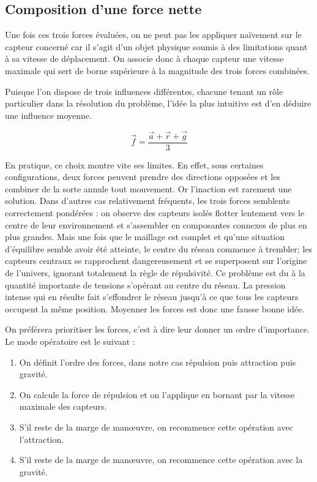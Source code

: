 \documentclass[10pt]{article}
\begin{document}
\begin{multicols}{2}
\subsection*{Composition d'une force nette}

Une fois ces trois forces évaluées, on ne peut pas les appliquer
naïvement sur le capteur concerné car il s'agit d'un objet physique
soumis à des limitations quant à sa vitesse de déplacement. On associe
donc à chaque capteur une vitesse maximale qui sert de borne
supérieure à la magnitude des trois forces combinées.

Puisque l'on dispose de trois influences différentes, chacune tenant
un rôle particulier dans la résolution du problème, l'idée la plus
intuitive est d'en déduire une influence moyenne.

$$
\vec{f} = \frac{\vec{a} + \vec{r} + \vec{g}}{3}
$$

En pratique, ce choix montre vite ses limites. En effet, sous
certaines configurations, deux forces peuvent prendre des directions
opposées et les combiner de la sorte annule tout mouvement. Or
l'inaction est rarement une solution. Dans d'autres cas relativement
fréquents, les trois forces semblents correctement pondérées : on
observe des capteurs isolés flotter lentement vers le centre de leur
environnement et s'assembler en composantes connexes de plus en plus
grandes. Mais une fois que le maillage est complet et qu'une situation
d'équilibre semble avoir été atteinte, le centre du réseau commence à
trembler; les capteurs centraux se rapprochent dangereusement et se
superposent sur l'origine de l'univers, ignorant totalement la règle
de répulsivité. Ce problème est du à la quantité importante de
tensions s'opérant au centre du réseau. La pression intense qui en
résulte fait s'effondrer le réseau jusqu'à ce que tous les capteurs
occupent la même position. Moyenner les forces est donc une fausse
bonne idée.

On préférera prioritiser les forces, c'est à dire leur donner un ordre
d'importance. Le mode opératoire est le suivant :

\begin{enumerate}
\item{On définit l'ordre des forces, dans notre cas répulsion puis
  attraction puis gravité.}
\item{On calcule la force de répulsion et on l'applique en bornant par
  la vitesse maximale des capteurs.}
\item{S'il reste de la marge de man\oe uvre, on recommence cette
  opération avec l'attraction.}
\item{S'il reste de la marge de man\oe uvre, on recommence cette
  opération avec la gravité.}
\end{enumerate}


\end{multicols}
\end{document}

